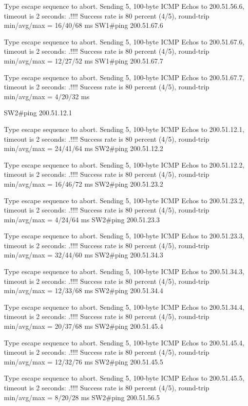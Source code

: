 \documentclass[10pt]{article}
\begin{document}
\begin{itemize}
\begin{verbatim*}
		Type escape sequence to abort.
		Sending 5, 100-byte ICMP Echos to 200.51.56.6, timeout is 2 seconds:
		.!!!!
		Success rate is 80 percent (4/5), round-trip min/avg/max = 16/40/68 ms
		SW1#ping 200.51.67.6

		Type escape sequence to abort.
		Sending 5, 100-byte ICMP Echos to 200.51.67.6, timeout is 2 seconds:
		.!!!!
		Success rate is 80 percent (4/5), round-trip min/avg/max = 12/27/52 ms
		SW1#ping 200.51.67.7

		Type escape sequence to abort.
		Sending 5, 100-byte ICMP Echos to 200.51.67.7, timeout is 2 seconds:
		.!!!!
		Success rate is 80 percent (4/5), round-trip min/avg/max = 4/20/32 ms

		SW2#ping 200.51.12.1

		Type escape sequence to abort.
		Sending 5, 100-byte ICMP Echos to 200.51.12.1, timeout is 2 seconds:
		.!!!!
		Success rate is 80 percent (4/5), round-trip min/avg/max = 24/41/64 ms
		SW2#ping 200.51.12.2

		Type escape sequence to abort.
		Sending 5, 100-byte ICMP Echos to 200.51.12.2, timeout is 2 seconds:
		.!!!!
		Success rate is 80 percent (4/5), round-trip min/avg/max = 16/46/72 ms
		SW2#ping 200.51.23.2

		Type escape sequence to abort.
		Sending 5, 100-byte ICMP Echos to 200.51.23.2, timeout is 2 seconds:
		.!!!!
		Success rate is 80 percent (4/5), round-trip min/avg/max = 4/24/64 ms
		SW2#ping 200.51.23.3

		Type escape sequence to abort.
		Sending 5, 100-byte ICMP Echos to 200.51.23.3, timeout is 2 seconds:
		.!!!!
		Success rate is 80 percent (4/5), round-trip min/avg/max = 32/44/60 ms
		SW2#ping 200.51.34.3

		Type escape sequence to abort.
		Sending 5, 100-byte ICMP Echos to 200.51.34.3, timeout is 2 seconds:
		.!!!!
		Success rate is 80 percent (4/5), round-trip min/avg/max = 12/33/68 ms
		SW2#ping 200.51.34.4

		Type escape sequence to abort.
		Sending 5, 100-byte ICMP Echos to 200.51.34.4, timeout is 2 seconds:
		.!!!!
		Success rate is 80 percent (4/5), round-trip min/avg/max = 20/37/68 ms
		SW2#ping 200.51.45.4

		Type escape sequence to abort.
		Sending 5, 100-byte ICMP Echos to 200.51.45.4, timeout is 2 seconds:
		.!!!!
		Success rate is 80 percent (4/5), round-trip min/avg/max = 12/32/76 ms
		SW2#ping 200.51.45.5

		Type escape sequence to abort.
		Sending 5, 100-byte ICMP Echos to 200.51.45.5, timeout is 2 seconds:
		.!!!!
		Success rate is 80 percent (4/5), round-trip min/avg/max = 8/20/28 ms
		SW2#ping 200.51.56.5


\end{verbatim*}
\end{itemize}
\end{document}
